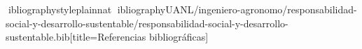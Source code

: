 \documentclass[spanish,letterpaper,oneside]{article}
\begin{document}
\hypersetup{pageanchor=false}
\begingroup
\fontsize{14}{17}\selectfont
\renewcommand{\Huge}{\fontsize{14}{17}\selectfont\bfseries}
\renewcommand{\large}{\fontsize{14}{17}\selectfont}
\templatePortrait
\clearpage
\endgroup
\hypersetup{pageanchor=true}
\templatePagecfg
\singlespacing
\setlength{\tabcolsep}{8pt}
\renewcommand{\arraystretch}{1.18}



\newpage
ibliographystyle{plainnat}
ibliography{UANL/ingeniero-agronomo/responsabilidad-social-y-desarrollo-sustentable/responsabilidad-social-y-desarrollo-sustentable.bib}[title={Referencias bibliográficas}]
\end{document}
